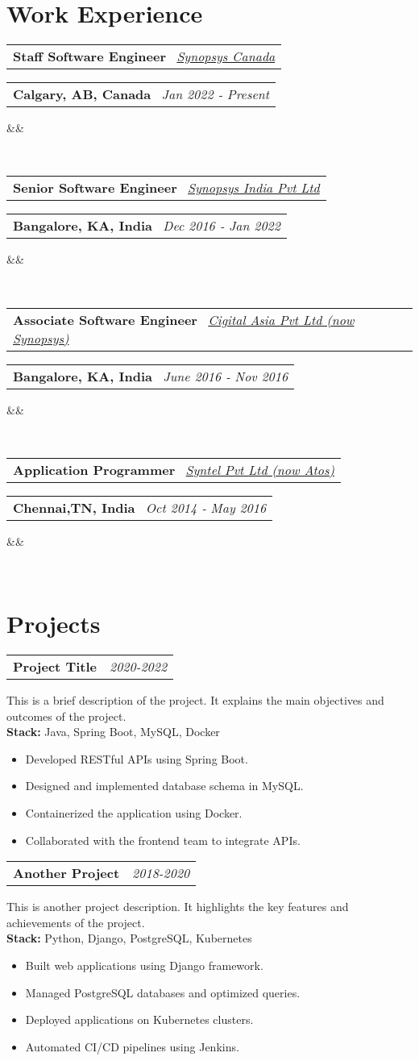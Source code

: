 \documentclass[14pt,a4paper,sans]{moderncv}
\makeatletter
\newcommand{\project}[5]{
    \noindent
    \begin{tabularx}{\textwidth}{Xr}
    \textbf{#1} & \textit{#2} \\
    \end{tabularx}
    #3 \\ %
    \noindent\textbf{Stack:} #4 %
    \begin{itemize}[label=\textbullet, left=1em] %
    #5 %
    \end{itemize}
    \vspace{1em} %
}
\newcommand*{\customcventry}[7][.13em]{
    \begin{tabular}{@{}l}
    {\bfseries #4} \
        {\itshape #3}
    \end{tabular}
    \hfill
    \begin{tabular}{l@{}}
    {\bfseries #5} \
        {\itshape #2}
    \end{tabular}
    \ifx
        &#7&%
    \else
            {\
        \begin{minipage}{\maincolumnwidth}%
        \small#7%
        \end{minipage}}
    \fi%
    \par\addvspace{#1}}
\makeatother
\begin{document}
    \section{Work Experience}

    \customcventry{Jan 2022 ‐ Present}{{\color{blue}\href{https://www.synopsys.com/}{Synopsys Canada}}}{Staff Software Engineer}{Calgary, AB, Canada}{}{}

    \customcventry{Dec 2016 ‐ Jan 2022}{{\color{blue}\href{https://www.synopsys.com/}{Synopsys India Pvt Ltd}}}{Senior Software Engineer}{Bangalore, KA, India}{}{}

    \customcventry{June 2016 ‐ Nov 2016}{{\color{blue}\href{https://www.synopsys.com/}{Cigital Asia Pvt Ltd (now Synopsys)}}}{Associate Software Engineer}{Bangalore, KA, India}{}{}

    \customcventry{Oct 2014 ‐ May 2016}{{\color{blue}\href{https://atos.net/en/}{Syntel Pvt Ltd  (now Atos)}}}{Application Programmer}{Chennai,TN, India}{}{}


    \section{Projects}

    \project{Project Title}{2020-2022}
    {This is a brief description of the project. It explains the main objectives and outcomes of the project.}
    {Java, Spring Boot, MySQL, Docker}
    {
        \item Developed RESTful APIs using Spring Boot.
        \item Designed and implemented database schema in MySQL.
        \item Containerized the application using Docker.
        \item Collaborated with the frontend team to integrate APIs.
    }

    \project{Another Project}{2018-2020}
    {This is another project description. It highlights the key features and achievements of the project.}
    {Python, Django, PostgreSQL, Kubernetes}
    {
        \item Built web applications using Django framework.
        \item Managed PostgreSQL databases and optimized queries.
        \item Deployed applications on Kubernetes clusters.
        \item Automated CI/CD pipelines using Jenkins.
    }
\end{document}
